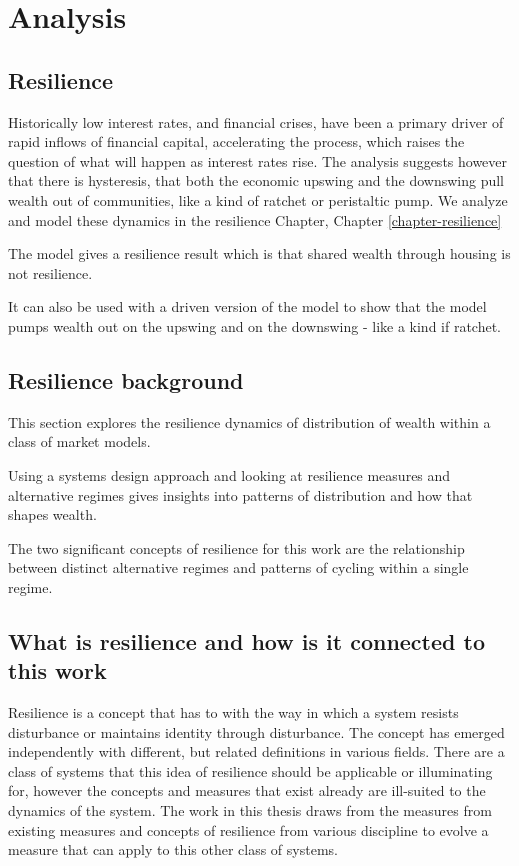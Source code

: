 \chapter{Analysis} \label{chapter-analysis}

\section{Resilience}
Historically low interest rates, and financial crises, have been a primary driver of rapid inflows of financial capital, accelerating the process, which raises the question of what will happen as interest rates rise. The analysis suggests however that there is hysteresis, that both the economic upswing and the downswing pull wealth out of communities, like a kind of ratchet or peristaltic pump. We analyze and model these dynamics in the resilience Chapter, Chapter \ref{chapter-resilience}


The model gives a resilience result which is that shared wealth through housing is not resilience.

It can also be used with a driven version of the model to show that the model pumps wealth out on the upswing and on the downswing - like a kind if ratchet.



\section{Resilience background}

This section explores the resilience dynamics of distribution of wealth within a class of market models.  

Using a systems design approach and looking at resilience measures and alternative regimes gives insights into patterns of distribution and how that shapes wealth. 

The two significant concepts of resilience for this work are the relationship between distinct alternative regimes and patterns of cycling within a single regime. 

\section{What is resilience and how is it connected to this work}

Resilience is a concept that has to with the way in which a system resists disturbance or maintains identity through disturbance. The concept has emerged independently with different, but related definitions in various fields. 
There are a class of systems that this idea of resilience should be applicable or illuminating for, however the concepts and measures that exist already are ill-suited to the dynamics of the system. 
The work in this thesis draws from the measures from existing measures and concepts of resilience from various discipline to evolve a measure that can apply to this other class of systems. 

